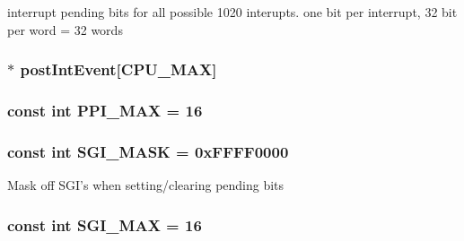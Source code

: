 \label{classPl390_a4a5f5a9735da74511b9d4e02c4ace364}
interrupt pending bits for all possible 1020 interupts. one bit per interrupt, 32 bit per word = 32 words \hypertarget{classPl390_a22e64a003aa14067af4bb07701cb88a5}{
\subsubsection[{postIntEvent}]{$\ast$ {\bf postIntEvent}\mbox{[}{\bf CPU\_\-MAX}\mbox{]}}}
\label{classPl390_a22e64a003aa14067af4bb07701cb88a5}
\hypertarget{classPl390_a5ff528d1355008104939d20af447bac8}{
\subsubsection[{PPI\_\-MAX}]{\setlength{\rightskip}{0pt plus 5cm}const int {\bf PPI\_\-MAX} = 16}}
\label{classPl390_a5ff528d1355008104939d20af447bac8}
\hypertarget{classPl390_af2b76f78cc36e39f8782a67aa03afbd0}{
\subsubsection[{sgi\_\-id}]{}}
\label{classPl390_af2b76f78cc36e39f8782a67aa03afbd0}
\hypertarget{classPl390_a5a2357b28c8821b1d9da7fc86a2e1e46}{
\subsubsection[{SGI\_\-MASK}]{\setlength{\rightskip}{0pt plus 5cm}const int {\bf SGI\_\-MASK} = 0xFFFF0000}}
\label{classPl390_a5a2357b28c8821b1d9da7fc86a2e1e46}
Mask off SGI's when setting/clearing pending bits \hypertarget{classPl390_ab882d232a4976cf54e9cb73b44e1988f}{
\subsubsection[{SGI\_\-MAX}]{\setlength{\rightskip}{0pt plus 5cm}const int {\bf SGI\_\-MAX} = 16}}
